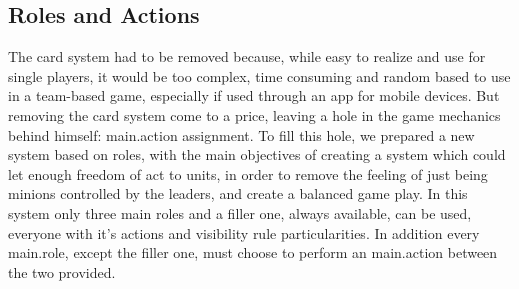 		\subsection{Roles and Actions}
		
			The card system had to be removed because, while easy to realize and use for single players, it would be too complex, time consuming and random based to use in a team-based game, especially if used through an app for mobile devices.
			But removing the card system come to a price, leaving a hole in the game mechanics behind himself: main.action assignment.
			To fill this hole, we prepared a new system based on roles, with the main objectives of creating a system which could let enough freedom of act to units, in order to remove the feeling of just being minions controlled by the leaders, and create a balanced game play.
			In this system only three main roles and a filler one, always available, can be used, everyone with it's actions and visibility rule particularities.
			In addition every main.role, except the filler one, must choose to perform an main.action between the two provided.
		
